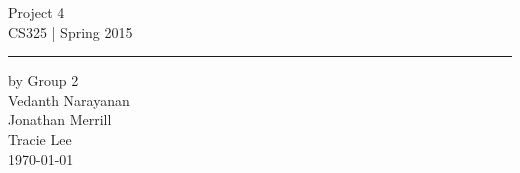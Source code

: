 \documentclass[11pt,letterpaper]{article}
\begin{document}
\begin{titlepage}
    \vspace*{4cm}
    \begin{flushright}
    {\huge
        Project 4\\[5mm]
    }
    {\large
        CS325 | Spring 2015
     }
    \end{flushright}
\hrule
    \begin{flushright}
	by Group 2\\
	Vedanth Narayanan\\
	Jonathan Merrill\\
	Tracie Lee\\
    \vfill
	\today\\
    \end{flushright}
\end{titlepage}

\raggedright
\end{document}
